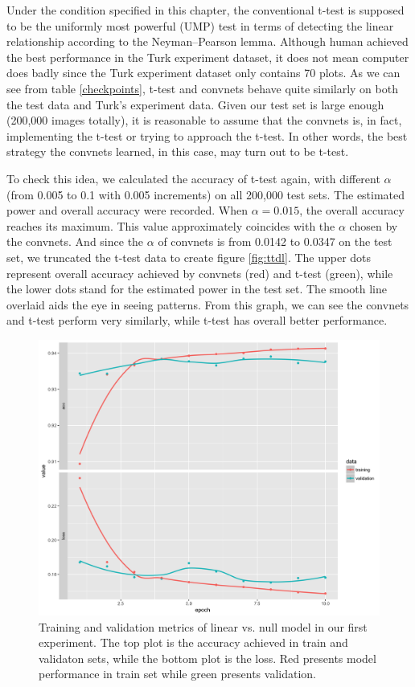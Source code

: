 \documentclass[12pt]{article}
\begin{document}
Under the condition specified in this chapter, the conventional t-test
is supposed to be the uniformly most powerful (UMP) test in terms of
detecting the linear relationship according to the Neyman--Pearson
lemma. \citep{Neyman289} Although human achieved the best performance in
the Turk experiment dataset, it does not mean computer does badly since
the Turk experiment dataset only contains 70 plots. As we can see from
table \ref{checkpoints}, t-test and convnets behave quite similarly on
both the test data and Turk's experiment data. Given our test set is
large enough (200,000 images totally), it is reasonable to assume that
the convnets is, in fact, implementing the t-test or trying to approach
the t-test. In other words, the best strategy the convnets learned, in
this case, may turn out to be t-test.

To check this idea, we calculated the accuracy of t-test again, with
different \(\alpha\) (from 0.005 to 0.1 with 0.005 increments) on all
200,000 test sets. The estimated power and overall accuracy were
recorded. When \(\alpha=0.015\), the overall accuracy reaches its
maximum. This value approximately coincides with the \(\alpha\) chosen
by the convnets. And since the \(\alpha\) of convnets is from 0.0142 to
0.0347 on the test set, we truncated the t-test data to create figure
\ref{fig:ttdl}. The upper dots represent overall accuracy achieved by
convnets (red) and t-test (green), while the lower dots stand for the
estimated power in the test set. The smooth line overlaid aids the eye
in seeing patterns. From this graph, we can see the convnets and t-test
perform very similarly, while t-test has overall better performance.

\begin{figure}[h]
\centerline{\includegraphics[width=15cm]{figures/linear_history_plot.png}}
\caption{Training and validation metrics of linear vs. null model in our first experiment. The top plot is the accuracy achieved in train and validaton sets, while the bottom plot is the loss. Red presents model performance in train set while green presents validation.}
\label{histlinear}
\end{figure}
\end{document}
